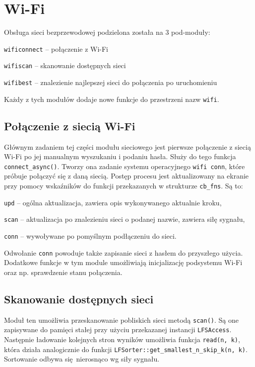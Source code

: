 \documentclass[polish]{aghengthesis}
\let\tempone\itemize
\let\temptwo\enditemize
\renewenvironment{itemize}{\tempone\setlength{\itemsep}{0cm}}{\temptwo}
\begin{document}
	\section{Wi-Fi}
		Obsługa sieci bezprzewodowej podzielona została na 3 pod-moduły:
		\begin{itemize}
			\item \lstinline|wificonnect| -- połączenie z Wi-Fi
			\item \lstinline|wifiscan| -- skanowanie dostępnych sieci
			\item \lstinline|wifibest| -- znalezienie najlepszej sieci do połączenia po uruchomieniu
		\end{itemize}
		
		Każdy z tych modułów dodaje nowe funkcje do przestrzeni nazw \lstinline|wifi|.
		
		\subsection{Połączenie z siecią Wi-Fi}
			Głównym zadaniem tej części modułu sieciowego jest pierwsze połączenie z siecią Wi-Fi po jej manualnym wyszukaniu i podaniu hasła. Służy do tego funkcja \lstinline|connect_async()|. Tworzy ona zadanie systemu operacyjnego \lstinline|wifi conn|, które próbuje połączyć się z daną siecią. Postęp procesu jest aktualizowany na ekranie przy pomocy wskaźników do funkcji przekazanych w strukturze \lstinline|cb_fns|. Są to:
			\begin{itemize}
				\item \lstinline|upd| -- ogólna aktualizacja, zawiera opis wykonywanego aktualnie kroku,
				\item \lstinline|scan| -- aktualizacja po znalezieniu sieci o podanej nazwie, zawiera siłę sygnału,
				\item \lstinline|conn| -- wywoływane po pomyślnym podłączeniu do sieci.
			\end{itemize}
			
			Odwołanie \lstinline|conn| powoduje także zapisanie sieci z hasłem do przyszłego użycia. Dodatkowe funkcje w tym module umożliwiają inicjalizację podsystemu Wi-Fi oraz np. sprawdzenie stanu połączenia.
			
		\subsection{Skanowanie dostępnych sieci}
			Moduł ten umożliwia przeskanowanie pobliskich sieci metodą \lstinline|scan()|. Są one zapisywane do pamięci stałej przy użyciu przekazanej instancji \lstinline|LFSAccess|. Następnie ładowanie kolejnych stron wyników umożliwia funkcja \lstinline|read(n, k)|, która działa analogicznie do funkcji \lstinline|LFSorter::get_smallest_n_skip_k(n, k)|. Sortowanie odbywa się nierosnąco wg siły sygnału.
			
\end{document}
